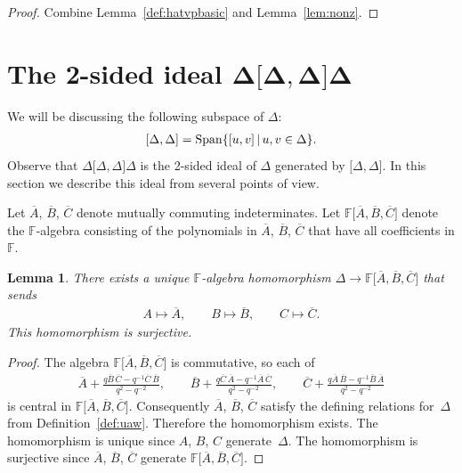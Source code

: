 \documentclass[pdftex]{sigma}
\numberwithin{equation}{section}
\newtheorem{Lemma}[Theorem]{Lemma}
\begin{document}
\begin{proof}
Combine
Lemma~\ref{def:hatvpbasic}
and
Lemma~\ref{lem:nonz}.
\end{proof}


\section[The 2-sided ideal $\Delta\lbrack  \Delta,\Delta\rbrack \Delta $]{The 2-sided ideal $\boldsymbol{\Delta\lbrack  \Delta,\Delta\rbrack \Delta}$}

We will be discussing the following
subspace of $\Delta $:
\begin{gather*}
\lbrack \Delta ,\Delta \rbrack =
{\rm Span}\lbrace \lbrack u,v \rbrack \,|\,u,v \in \Delta \rbrace.
\end{gather*}
Observe that
$\Delta \lbrack  \Delta ,\Delta \rbrack \Delta $
is the 2-sided ideal of $\Delta $ generated by
$\lbrack \Delta ,\Delta \rbrack$.
In this section we describe this ideal from several
points of view.

 Let
$\overline A$,
$\overline B$,
$\overline C$ denote mutually commuting indeterminates.
Let $\mathbb F\lbrack
\overline A,
\overline B,
\overline C
\rbrack$
denote the $\mathbb F$-algebra consisting of the polynomials
in $
\overline A$,
$\overline B$,
$\overline C
$
 that have all coef\/f\/icients in $\mathbb F$.

\begin{Lemma}
\label{lem:com2}
There exists a unique $\mathbb F$-algebra homomorphism
$\Delta \to
\mathbb F\lbrack
\overline A,
\overline B,
\overline C
\rbrack $
that sends
\begin{gather*}
A \mapsto \overline A,
\qquad
B \mapsto \overline B,
\qquad
C \mapsto \overline C.
\end{gather*}
This homomorphism is surjective.
\end{Lemma}

\begin{proof}
The algebra
$
\mathbb F\lbrack
\overline A,
\overline B,
\overline C
\rbrack $ is commutative, so each of
\begin{gather*}
 \overline A+ \frac{q\overline B \,
\overline C-q^{-1}\overline C \, \overline B}{q^2-q^{-2}},
\qquad
\overline B+
\frac{q\overline C\, \overline A-q^{-1}\overline A \,\overline C}{q^2-q^{-2}},
\qquad
\overline C+
\frac{q\overline A\,\overline B-q^{-1}\overline B\,\overline A}{q^2-q^{-2}}
\end{gather*}
is central in
$
\mathbb F\lbrack
\overline A,
\overline B,
\overline C
\rbrack $.
Consequently
$\overline A$,
$\overline B$,
$\overline C
$ satisfy the def\/ining relations for~$\Delta $ from
Def\/inition~\ref{def:uaw}. Therefore the homomorphism exists.
The homomorphism is unique since
$A$,
$B$,
$C$ generate~$\Delta $.
The homomorphism is surjective
since
$
\overline A$,
$\overline B$,
$\overline C
$
generate
$
\mathbb F\lbrack
\overline A,
\overline B,
\overline C
\rbrack $.
\end{proof}
\end{document}
